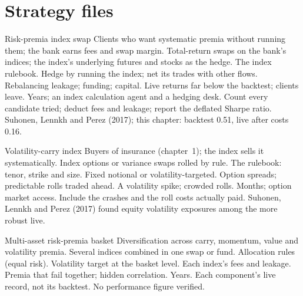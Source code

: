 \section{Strategy files}

\begin{strategyfile}{Risk-premia index swap}\label{strat:s2:quantitative-investment-strategies:rp}
 Clients who want systematic premia without running them; the bank earns fees and swap margin.
 Total-return swaps on the bank's indices; the index's underlying futures and stocks as the hedge.
 The index rulebook.
 Hedge by running the index; net its trades with other flows.
 Rebalancing leakage; funding; capital.
 Live returns far below the backtest; clients leave.
 Years; an index calculation agent and a hedging desk.
 Count every candidate tried; deduct fees and leakage; report the deflated Sharpe ratio.
 Suhonen, Lennkh and Perez (2017); this chapter: backtest 0.51, live after costs 0.16.
\end{strategyfile}

\begin{strategyfile}{Volatility-carry index}\label{strat:s2:quantitative-investment-strategies:volcarry}
 Buyers of insurance (chapter~1); the index sells it systematically.
 Index options or variance swaps rolled by rule.
 The rulebook: tenor, strike and size.
 Fixed notional or volatility-targeted.
 Option spreads; predictable rolls traded ahead.
 A volatility spike; crowded rolls.
 Months; option market access.
 Include the crashes and the roll costs actually paid.
 Suhonen, Lennkh and Perez (2017) found equity volatility exposures among the more robust live.
\end{strategyfile}

\begin{strategyfile}{Multi-asset risk-premia basket}\label{strat:s2:quantitative-investment-strategies:basket}
 Diversification across carry, momentum, value and volatility premia.
 Several indices combined in one swap or fund.
 Allocation rules (equal risk).
 Volatility target at the basket level.
 Each index's fees and leakage.
 Premia that fail together; hidden correlation.
 Years.
 Each component's live record, not its backtest.
 No performance figure verified.
\end{strategyfile}

